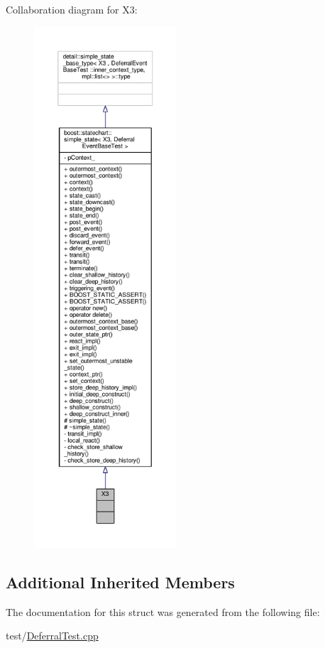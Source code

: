 Collaboration diagram for X3\+:
\nopagebreak
\begin{figure}[H]
\begin{center}
\leavevmode
\includegraphics[height=550pt]{struct_x3__coll__graph}
\end{center}
\end{figure}
\subsection*{Additional Inherited Members}


The documentation for this struct was generated from the following file\+:\begin{DoxyCompactItemize}
\item 
test/\mbox{\hyperlink{_deferral_test_8cpp}{Deferral\+Test.\+cpp}}\end{DoxyCompactItemize}
